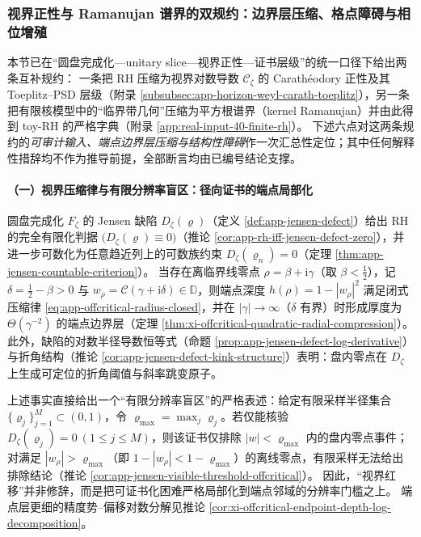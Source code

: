 \subsubsection{视界正性与 Ramanujan 谱界的双规约：边界层压缩、格点障碍与相位增殖}\label{subsubsec:xi-horizon-ramanujan-feasible-reduction}
本节已在“圆盘完成化—unitary slice—视界正性—证书层级”的统一口径下给出两条互补规约：
一条把 RH 压缩为视界对数导数 \(\mathscr{C}_{\zeta}\) 的 Carath\'eodory 正性及其 Toeplitz--PSD 层级（附录 \ref{subsubsec:app-horizon-weyl-carath-toeplitz}），另一条把有限核模型中的“临界带几何”压缩为平方根谱界（kernel Ramanujan）并由此得到 toy-RH 的严格字典（附录 \ref{app:real-input-40-finite-rh}）。
下述六点对这两条规约的\emph{可审计输入、端点边界层压缩与结构性障碍}作一次汇总性定位；其中任何解释性措辞均不作为推导前提，全部断言均由已编号结论支撑。

\paragraph{（一）视界压缩律与有限分辨率盲区：径向证书的端点局部化}
圆盘完成化 \(F_{\zeta}\) 的 Jensen 缺陷 \(D_{\zeta}(\varrho)\)（定义 \ref{def:app-jensen-defect}）给出 RH 的完全有限化判据
\(\bigl(D_{\zeta}(\varrho)\equiv 0\bigr)\)（推论 \ref{cor:app-rh-iff-jensen-defect-zero}），并进一步可数化为任意趋近列上的可数族约束 \(D_{\zeta}(\varrho_n)=0\)（定理 \ref{thm:app-jensen-countable-criterion}）。
当存在离临界线零点 \(\rho=\beta+\mathrm{i}\gamma\)（取 \(\beta<\tfrac12\)），记 \(\delta=\tfrac12-\beta>0\) 与 \(w_{\rho}=\mathcal{C}(\gamma+\mathrm{i}\delta)\in\mathbb{D}\)，则端点深度
\(
h(\rho)=1-|w_{\rho}|^{2}
\)
满足闭式压缩律 \eqref{eq:app-offcritical-radius-closed}，并在 \(|\gamma|\to\infty\)（\(\delta\) 有界）时形成厚度为 \(\Theta(\gamma^{-2})\) 的端点边界层（定理 \ref{thm:xi-offcritical-quadratic-radial-compression}）。
此外，缺陷的对数半径导数恒等式（命题 \ref{prop:app-jensen-defect-log-derivative}）与折角结构（推论 \ref{cor:app-jensen-defect-kink-structure}）表明：盘内零点在 \(D_{\zeta}\) 上生成可定位的折角阈值与斜率跳变原子。
\par
上述事实直接给出一个“有限分辨率盲区”的严格表述：给定有限采样半径集合 \(\{\varrho_j\}_{j=1}^{M}\subset(0,1)\)，令 \(\varrho_{\max}=\max_j\varrho_j\)。若仅能核验
\(
D_{\zeta}(\varrho_j)=0\ (1\le j\le M)
\)，则该证书仅排除 \(|w|<\varrho_{\max}\) 内的盘内零点事件；对满足 \(|w_{\rho}|>\varrho_{\max}\)（即 \(1-|w_{\rho}|<1-\varrho_{\max}\)）的离线零点，有限采样无法给出排除结论（推论 \ref{cor:app-jensen-visible-threshold-offcritical}）。
因此，“视界红移”并非修辞，而是把可证书化困难严格局部化到端点邻域的分辨率门槛之上。
端点层更细的精度势--偏移对数分解见推论 \ref{cor:xi-offcritical-endpoint-depth-log-decomposition}。

